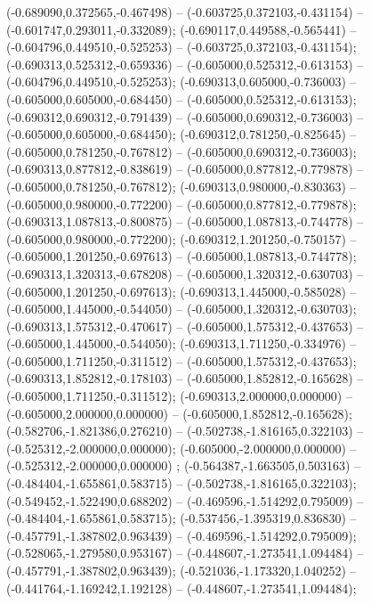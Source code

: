  (-0.689090,0.372565,-0.467498) -- (-0.603725,0.372103,-0.431154) -- (-0.601747,0.293011,-0.332089);
 (-0.690117,0.449588,-0.565441) -- (-0.604796,0.449510,-0.525253) -- (-0.603725,0.372103,-0.431154);
 (-0.690313,0.525312,-0.659336) -- (-0.605000,0.525312,-0.613153) -- (-0.604796,0.449510,-0.525253);
 (-0.690313,0.605000,-0.736003) -- (-0.605000,0.605000,-0.684450) -- (-0.605000,0.525312,-0.613153);
 (-0.690312,0.690312,-0.791439) -- (-0.605000,0.690312,-0.736003) -- (-0.605000,0.605000,-0.684450);
 (-0.690312,0.781250,-0.825645) -- (-0.605000,0.781250,-0.767812) -- (-0.605000,0.690312,-0.736003);
 (-0.690313,0.877812,-0.838619) -- (-0.605000,0.877812,-0.779878) -- (-0.605000,0.781250,-0.767812);
 (-0.690313,0.980000,-0.830363) -- (-0.605000,0.980000,-0.772200) -- (-0.605000,0.877812,-0.779878);
 (-0.690313,1.087813,-0.800875) -- (-0.605000,1.087813,-0.744778) -- (-0.605000,0.980000,-0.772200);
 (-0.690312,1.201250,-0.750157) -- (-0.605000,1.201250,-0.697613) -- (-0.605000,1.087813,-0.744778);
 (-0.690313,1.320313,-0.678208) -- (-0.605000,1.320312,-0.630703) -- (-0.605000,1.201250,-0.697613);
 (-0.690313,1.445000,-0.585028) -- (-0.605000,1.445000,-0.544050) -- (-0.605000,1.320312,-0.630703);
 (-0.690313,1.575312,-0.470617) -- (-0.605000,1.575312,-0.437653) -- (-0.605000,1.445000,-0.544050);
 (-0.690313,1.711250,-0.334976) -- (-0.605000,1.711250,-0.311512) -- (-0.605000,1.575312,-0.437653);
 (-0.690313,1.852812,-0.178103) -- (-0.605000,1.852812,-0.165628) -- (-0.605000,1.711250,-0.311512);
 (-0.690313,2.000000,0.000000) -- (-0.605000,2.000000,0.000000) -- (-0.605000,1.852812,-0.165628);
 (-0.582706,-1.821386,0.276210) -- (-0.502738,-1.816165,0.322103) -- (-0.525312,-2.000000,0.000000);
 (-0.605000,-2.000000,0.000000) -- (-0.525312,-2.000000,0.000000) ;
 (-0.564387,-1.663505,0.503163) -- (-0.484404,-1.655861,0.583715) -- (-0.502738,-1.816165,0.322103);
 (-0.549452,-1.522490,0.688202) -- (-0.469596,-1.514292,0.795009) -- (-0.484404,-1.655861,0.583715);
 (-0.537456,-1.395319,0.836830) -- (-0.457791,-1.387802,0.963439) -- (-0.469596,-1.514292,0.795009);
 (-0.528065,-1.279580,0.953167) -- (-0.448607,-1.273541,1.094484) -- (-0.457791,-1.387802,0.963439);
 (-0.521036,-1.173320,1.040252) -- (-0.441764,-1.169242,1.192128) -- (-0.448607,-1.273541,1.094484);
